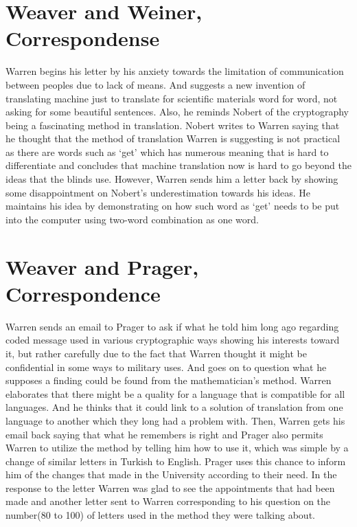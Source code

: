\documentclass{report}
\begin{document}
%

\section{Weaver and Weiner, Correspondense}
 Warren begins his letter by his anxiety towards the limitation of communication between peoples due to lack of means. And suggests a new invention of translating machine just to translate for scientific materials word for word, not asking for some beautiful sentences. Also, he reminds Nobert of the cryptography being a fascinating method in translation. Nobert writes to Warren saying that he thought that the method of translation Warren is suggesting is not practical as there are words such as ‘get’ which has numerous meaning that is hard to differentiate and concludes that machine translation now is hard to go beyond the ideas that the blinds use. However, Warren sends him a letter back by showing some disappointment on Nobert’s underestimation towards his ideas. He maintains his idea by demonstrating on how such word as ‘get’ needs to be put into the computer using two-word combination as one word.

\section{Weaver and Prager, Correspondence}
Warren sends an email to Prager to ask if what he told him long ago regarding coded message used in various cryptographic ways showing his interests toward it, but rather carefully due to the fact that Warren thought it might be confidential in some ways to military uses. And goes on to question what he supposes a finding could be found from the mathematician’s method. Warren elaborates that there might be a quality for a language that is compatible for all languages. And he thinks that it could link to a solution of translation from one language to another which they long had a problem with. Then, Warren gets his email back saying that what he remembers is right and Prager also permits Warren to utilize the method by telling him how to use it, which was simple by a change of similar letters in Turkish to English. Prager uses this chance to inform him of the changes that made in the University according to their need. In the response to the letter Warren was glad to see the appointments that had been made and another letter sent to Warren corresponding to his question on the number(80 to 100) of letters used in the method they were talking about.
\end{document}
